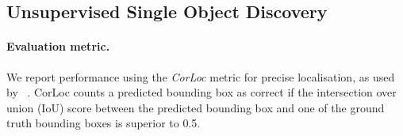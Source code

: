 \documentclass[twocolumn]{article}
\begin{document}
\subsection{Unsupervised Single Object Discovery}
\label{sec:unsupervised_object_discovery}








\paragraph{Evaluation metric.}

We report performance using the \emph{CorLoc} metric for precise localisation, as used by  ~\cite{deselaers2010localizing, vo2020toward,vo2021large,vo2019unsupervised, wei2019unsupervised,cho2015unsupervised,siva2013looking}. 
CorLoc counts a predicted bounding box as correct if the intersection over union (IoU) score between the predicted bounding box and one of the ground truth bounding boxes is superior to 0.5. 
\end{document}
